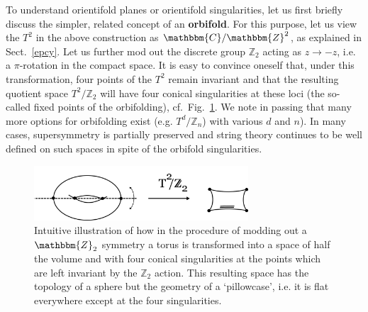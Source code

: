 \documentclass[12pt]{article}
\numberwithin{equation}{section}
\begin{document}
To understand orientifold planes or orientifold singularities, let us first briefly discuss the simpler, related concept of an {\bf orbifold}. For this purpose, let us view the $T^2$ in the above construction as $\mathbbm{C}/\mathbbm{Z}^2$, as explained in Sect.~\ref{epcy}. Let us further mod out the discrete group $\mathbb{Z}_2$ acting as $z\to -z$, i.e. a $\pi$-rotation in the compact space. It is easy to convince oneself that, under this transformation, four points of the $T^2$ remain invariant and that the resulting quotient space $T^2/\mathbb{Z}_2$ will have four conical singularities at these loci (the so-called fixed points of the orbifolding), cf.~Fig.~\ref{orbi}. We note in passing that many more options for orbifolding exist (e.g. $T^d/\mathbb{Z}_n$) with various $d$ and $n$). In many cases, supersymmetry is partially preserved and string theory continues to be well defined on such spaces in spite of the orbifold singularities.

\begin{figure}[ht]
\begin{center} 
\includegraphics[width=8cm]{orbi.png}
\caption{Intuitive illustration of how in the procedure of modding out a $\mathbbm{Z}_2$ symmetry a torus is transformed into a space of half the volume and with four conical singularities at the points which are left invariant by the $\mathbb{Z}_2$ action. This resulting space has the topology of a sphere but the geometry of a `pillowcase', i.e. it is flat everywhere except at the four singularities.}
\label{orbi} 
\end{center}
\end{figure}
\end{document}
